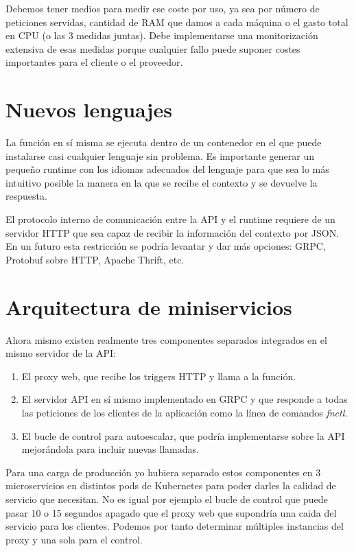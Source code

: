 Debemos tener medios para medir ese coste por uso, ya sea por número de peticiones servidas, cantidad de RAM que damos a cada máquina o el gasto total en CPU (o las 3 medidas juntas). Debe implementarse una monitorización extensiva de esas medidas porque cualquier fallo puede suponer costes importantes para el cliente o el proveedor.

\section{Nuevos lenguajes}

La función en sí misma se ejecuta dentro de un contenedor en el que puede instalarse casi cualquier lenguaje sin problema. Es importante generar un pequeño runtime con los idiomas adecuados del lenguaje para que sea lo más intuitivo posible la manera en la que se recibe el contexto y se devuelve la respuesta.

El protocolo interno de comunicación entre la API y el runtime requiere de un servidor HTTP que sea capaz de recibir la información del contexto por JSON. En un futuro esta restricción se podría levantar y dar más opciones: GRPC, Protobuf sobre HTTP, Apache Thrift, etc.

\section{Arquitectura de miniservicios}

Ahora mismo existen realmente tres componentes separados integrados en el mismo servidor de la API:
\begin{enumerate}
    \item El proxy web, que recibe los triggers HTTP y llama a la función.
    \item El servidor API en sí mismo implementado en GRPC y que responde a todas las peticiones de los clientes de la aplicación como la línea de comandos \emph{fnctl}.
    \item El bucle de control para autoescalar, que podría implementarse sobre la API mejorándola para incluir nuevas llamadas.
\end{enumerate}

Para una carga de producción yo hubiera separado estos componentes en 3 microservicios en distintos pods de Kubernetes para poder darles la calidad de servicio que necesitan. No es igual por ejemplo el bucle de control que puede pasar 10 o 15 segundos apagado que el proxy web que supondría una caida del servicio para los clientes. Podemos por tanto determinar múltiples instancias del proxy y una sola para el control.

